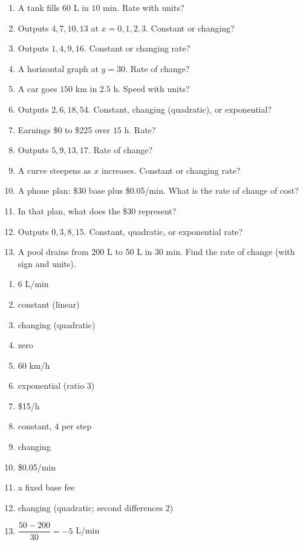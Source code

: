 \documentclass[11pt]{article}
\begin{document}
\begin{recapbox}
\begin{multicols}{2}
\small
\begin{enumerate}[leftmargin=*,itemsep=3pt]
  \item A tank fills $60$ L in $10$ min. Rate with units?
  \item Outputs $4,7,10,13$ at $x=0,1,2,3$. Constant or changing?
  \item Outputs $1,4,9,16$. Constant or changing rate?
  \item A horizontal graph at $y=30$. Rate of change?
  \item A car goes $150$ km in $2.5$ h. Speed with units?
  \item Outputs $2,6,18,54$. Constant, changing (quadratic), or exponential?
  \item Earnings \$0 to \$225 over $15$ h. Rate?
  \item Outputs $5,9,13,17$. Rate of change?
  \item A curve steepens as $x$ increases. Constant or changing rate?
  \item A phone plan: \$30 base plus \$0.05/min. What is the rate of change of cost?
  \item In that plan, what does the \$30 represent?
  \item Outputs $0,3,8,15$. Constant, quadratic, or exponential rate?
  \item A pool drains from $200$ L to $50$ L in $30$ min. Find the rate of change (with sign and units).
\end{enumerate}
\end{multicols}
\end{recapbox}

\begin{keybox}
\begin{multicols}{2}
\small
\begin{enumerate}[leftmargin=*,itemsep=3pt]
  \item $6$ L/min
  \item constant (linear)
  \item changing (quadratic)
  \item zero
  \item $60$ km/h
  \item exponential (ratio $3$)
  \item \$15/h
  \item constant, $4$ per step
  \item changing
  \item \$0.05/min
  \item a fixed base fee
  \item changing (quadratic; second differences $2$)
  \item $\dfrac{50-200}{30}=-5$ L/min
\end{enumerate}
\end{multicols}
\end{keybox}
\end{document}
